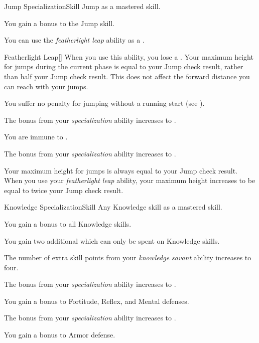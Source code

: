     \begin{feat}{Jump Specialization}{Skill}
        \featpre Jump as a mastered skill.

         You gain a  bonus to the Jump skill.

         You can use the \textit{featherlight leap} ability as a .
        \begin{freeability}{Featherlight Leap}[]
            When you use this ability, you lose a .
            Your maximum height for jumps during the current phase is equal to your Jump check result, rather than half your Jump check result.
            This does not affect the forward distance you can reach with your jumps.
        \end{freeability}

         You suffer no penalty for jumping without a running start (see ).

         The bonus from your \textit{specialization} ability increases to .

         You are immune to .

         The bonus from your \textit{specialization} ability increases to .

         Your maximum height for jumps is always equal to your Jump check result.
        When you use your \textit{featherlight leap} ability, your maximum height increases to be equal to twice your Jump check result.
    \end{feat}

    \begin{feat}{Knowledge Specialization}{Skill}
        \featpre Any Knowledge skill as a mastered skill.

         You gain a  bonus to all Knowledge skills.

         You gain two additional  which can only be spent on Knowledge skills.

         The number of extra skill points from your \textit{knowledge savant} ability increases to four.

         The bonus from your \textit{specialization} ability increases to .

         You gain a  bonus to Fortitude, Reflex, and Mental defenses. 

         The bonus from your \textit{specialization} ability increases to .

         You gain a  bonus to Armor defense.
    \end{feat}

